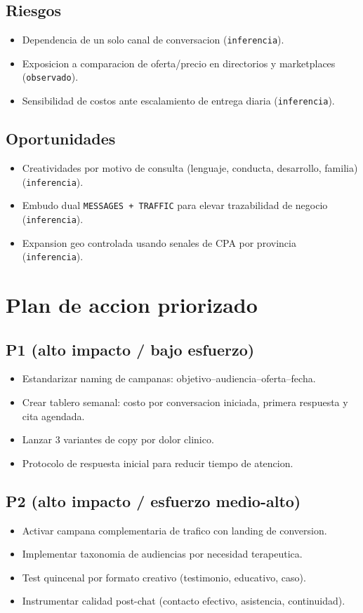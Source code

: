 \documentclass[9pt,a4paper,twocolumn,twoside]{tau-class/tau}
\begin{document}
\subsection{Riesgos}
\begin{itemize}
  \item Dependencia de un solo canal de conversacion (\texttt{inferencia}).
  \item Exposicion a comparacion de oferta/precio en directorios y marketplaces (\texttt{observado}).
  \item Sensibilidad de costos ante escalamiento de entrega diaria (\texttt{inferencia}).
\end{itemize}

\subsection{Oportunidades}
\begin{itemize}
  \item Creatividades por motivo de consulta (lenguaje, conducta, desarrollo, familia) (\texttt{inferencia}).
  \item Embudo dual \texttt{MESSAGES + TRAFFIC} para elevar trazabilidad de negocio (\texttt{inferencia}).
  \item Expansion geo controlada usando senales de CPA por provincia (\texttt{inferencia}).
\end{itemize}

\section{Plan de accion priorizado}

\subsection{P1 (alto impacto / bajo esfuerzo)}
\begin{itemize}
  \item Estandarizar naming de campanas: objetivo--audiencia--oferta--fecha.
  \item Crear tablero semanal: costo por conversacion iniciada, primera respuesta y cita agendada.
  \item Lanzar 3 variantes de copy por dolor clinico.
  \item Protocolo de respuesta inicial para reducir tiempo de atencion.
\end{itemize}

\subsection{P2 (alto impacto / esfuerzo medio-alto)}
\begin{itemize}
  \item Activar campana complementaria de trafico con landing de conversion.
  \item Implementar taxonomia de audiencias por necesidad terapeutica.
  \item Test quincenal por formato creativo (testimonio, educativo, caso).
  \item Instrumentar calidad post-chat (contacto efectivo, asistencia, continuidad).
\end{itemize}
\end{document}
